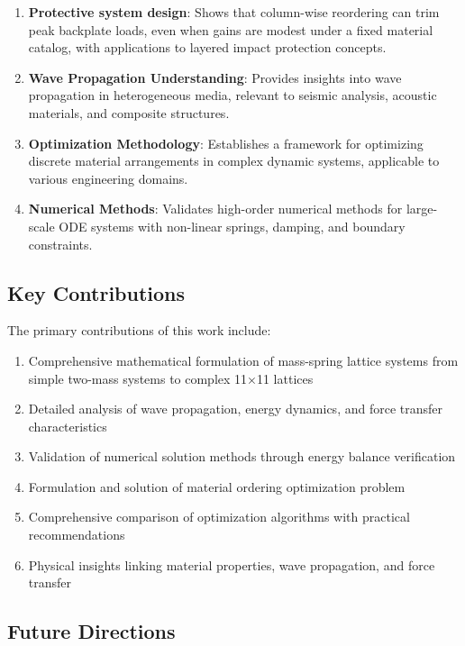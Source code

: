 \documentclass[11pt,a4paper]{article}
\begin{document}
\begin{enumerate}
    \item \textbf{Protective system design}: Shows that column-wise reordering can trim peak backplate loads, even when gains are modest under a fixed material catalog, with applications to layered impact protection concepts.
    
    \item \textbf{Wave Propagation Understanding}: Provides insights into wave propagation in heterogeneous media, relevant to seismic analysis, acoustic materials, and composite structures.
    
    \item \textbf{Optimization Methodology}: Establishes a framework for optimizing discrete material arrangements in complex dynamic systems, applicable to various engineering domains.
    
    \item \textbf{Numerical Methods}: Validates high-order numerical methods for large-scale ODE systems with non-linear springs, damping, and boundary constraints.
\end{enumerate}

\subsection{Key Contributions}

\noindent The primary contributions of this work include:

\begin{enumerate}
    \item Comprehensive mathematical formulation of mass-spring lattice systems from simple two-mass systems to complex 11×11 lattices
    \item Detailed analysis of wave propagation, energy dynamics, and force transfer characteristics
    \item Validation of numerical solution methods through energy balance verification
    \item Formulation and solution of material ordering optimization problem
    \item Comprehensive comparison of optimization algorithms with practical recommendations
    \item Physical insights linking material properties, wave propagation, and force transfer
\end{enumerate}

\subsection{Future Directions}
\end{document}

